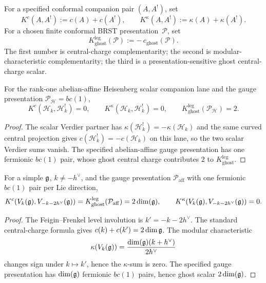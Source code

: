 \begin{definition}
\label{def:uc-scalar-packages}
For a specified conformal companion pair $(A,A^!)$, set
\[
 K^c(A,A^!) := c(A)+c(A^!),\qquad
 K^\kappa(A,A^!) := \kappa(A)+\kappa(A^!).
\]
For a chosen finite conformal BRST presentation~$\mathcal P$, set
\[
 K_{\mathrm{ghost}}^{\mathrm{leg}}(\mathcal P)
 :=
 -\,c_{\mathrm{ghost}}(\mathcal P).
\]
The first number is central-charge complementarity; the second is
modular-characteristic complementarity; the third is a
presentation-sensitive ghost central-charge scalar.
\end{definition}

\begin{corollary}
\label{cor:uc-K-heisenberg}
\ClaimStatusProvedHere
For the rank-one abelian-affine Heisenberg scalar companion lane and
the gauge presentation $\mathcal P_{\mathcal H}=bc(1)$,
\[
 K^c(\mathcal H_k,\mathcal H_k^!)=0,\qquad
 K^\kappa(\mathcal H_k,\mathcal H_k^!)=0,\qquad
 K_{\mathrm{ghost}}^{\mathrm{leg}}(\mathcal P_{\mathcal H})=2.
\]
\end{corollary}

\begin{proof}
The scalar Verdier partner has
$\kappa(\mathcal H_k^!)=-\kappa(\mathcal H_k)$ and the same curved
central projection gives $c(\mathcal H_k^!)=-c(\mathcal H_k)$ on this
lane, so the two scalar Verdier sums vanish. The specified
abelian-affine gauge presentation has one fermionic $bc(1)$ pair, whose
ghost central charge contributes $2$ to
$K_{\mathrm{ghost}}^{\mathrm{leg}}$.
\end{proof}

\begin{corollary}
\label{cor:uc-K-affine-KM}
\ClaimStatusProvedHere
For a simple $\mathfrak{g}$, $k\ne-h^\vee$, and the gauge presentation
$\mathcal P_{\mathrm{aff}}$ with one fermionic $bc(1)$ pair per Lie
direction,
\[
 K^c(V_k(\mathfrak{g}),V_{-k-2h^\vee}(\mathfrak{g}))
 =
 K_{\mathrm{ghost}}^{\mathrm{leg}}(\mathcal P_{\mathrm{aff}})
 =2\dim(\mathfrak{g}),
 \qquad
 K^\kappa(V_k(\mathfrak{g}),V_{-k-2h^\vee}(\mathfrak{g}))=0.
\]
\end{corollary}

\begin{proof}
The Feigin--Frenkel level involution is $k'=-k-2h^\vee$. The standard
central-charge formula gives $c(k)+c(k')=2\dim\mathfrak{g}$. The modular
characteristic
\[
\kappa(V_k(\mathfrak{g}))
=\frac{\dim(\mathfrak{g})(k+h^\vee)}{2h^\vee}
\]
changes sign under $k\mapsto k'$, hence the $\kappa$-sum is zero. The
specified gauge presentation has $\dim(\mathfrak{g})$ fermionic $bc(1)$
pairs, hence ghost scalar $2\dim(\mathfrak{g})$.
\end{proof}


